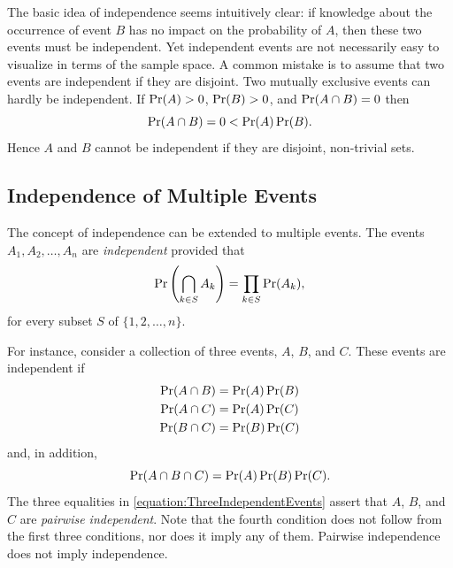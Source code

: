 The basic idea of independence seems intuitively clear: if knowledge about the occurrence of event $B$ has no impact on the probability of $A$, then these two events must be independent.
Yet independent events are not necessarily easy to visualize in terms of the sample space.
A common mistake is to assume that two events are independent if they are disjoint.
Two mutually exclusive events can hardly be independent.
If $\Pr (A) > 0$, $\Pr (B) > 0$, and $\Pr (A \cap B) = 0$ then
\begin{equation*}
\Pr (A \cap B) = 0 < \Pr (A) \Pr(B).
\end{equation*}
Hence $A$ and $B$ cannot be independent if they are disjoint, non-trivial sets.


\subsection{Independence of Multiple Events}

The concept of independence can be extended to multiple events.
The events $A_1, A_2, \ldots, A_n$ are \emph{independent} provided that
\begin{equation*}
\Pr \left( \bigcap_{k \in S} A_k \right)
= \prod_{k \in S} \Pr (A_k) ,
\end{equation*}
for every subset $S$ of $\{1, 2, \ldots, n\}$.

For instance, consider a collection of three events, $A$, $B$, and $C$.
These events are independent if
\begin{equation} \label{equation:ThreeIndependentEvents}
\begin{split}
\Pr (A \cap B) &= \Pr (A) \Pr (B) \\
\Pr (A \cap C) &= \Pr (A) \Pr (C) \\
\Pr (B \cap C) &= \Pr (B) \Pr (C)
\end{split}
\end{equation}
and, in addition,
\begin{equation*}
\Pr (A \cap B \cap C) = \Pr (A) \Pr (B) \Pr(C) .
\end{equation*}
The three equalities in \eqref{equation:ThreeIndependentEvents} assert that $A$, $B$, and $C$ are \emph{pairwise independent}.
Note that the fourth condition does not follow from the first three conditions, nor does it imply any of them.
Pairwise independence does not imply independence.

